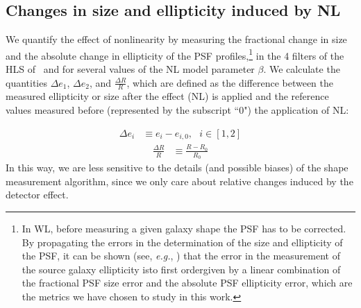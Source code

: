 \documentclass[11pt,preprint,flushrt]{aastex}
\begin{document}
\subsection{Changes in size and ellipticity induced by NL}

We quantify the effect of nonlinearity by measuring the fractional change in size and the absolute change in ellipticity of the PSF profiles,\footnote{In WL, before measuring a given galaxy shape the PSF has to be corrected. By propagating the errors in the determination of the size and ellipticity of the PSF, it can be shown (see, \emph{e.g.}, \citealt{paulin08}) that the error in the measurement of the source galaxy ellipticity is\textemdash to first order\textemdash given by a linear combination of the fractional PSF size error and the absolute PSF ellipticity error, which are the metrics we have chosen to study in this work.} in the 4 filters of the HLS of \wfa\, and for several values of the NL model parameter $\beta$. We calculate the quantities $\Delta e_1$, $\Delta e_2$, and $\frac{\Delta R}{R}$, which are defined as the difference between the measured ellipticity or size after the effect (NL) is applied and the reference values measured before (represented by the subscript ``$0$") the application of NL:

\begin{align}
\Delta e_{i} &\equiv e_{i} - e_{i,0},\ \ \ i\in[1,2]  
\label{delta_e}
\end{align}
\begin{align}
\frac{\Delta R}{R} &\equiv \frac {{R} - R_{0}}  { R_{0}}
\label{delta_r}
\end{align}
In this way, we are less sensitive to the details (and possible biases) of the shape measurement algorithm, since we only care about relative changes induced by the detector effect. 
\end{document}
